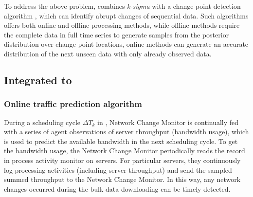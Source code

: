 {%
To address the above problem, \name combines \textit{k-sigma} with a change point detection algorithm \cite{adams2007bayesian}, which can identify abrupt changes of sequential data. Such algorithms offers both online and offline processing methods, while offline methods \cite{smith1975bayesian,stephens1994bayesian,barry1993bayesian,green1995reversible} require the complete data in full time series to generate samples from the posterior distribution over change point locations, online methods \cite{page1955test,desobry2005online,lorden1971procedures} can generate an accurate distribution of the next unseen data with only already observed data.

\subsection{Integrated to \bdsname}
\subsubsection{Online traffic prediction algorithm}


During a scheduling cycle $\Delta T_k$ in \name, Network Change Monitor is continually fed with a series of agent observations of server throughput (bandwidth usage), which is used to predict the available bandwidth in the next scheduling cycle. To get the bandwidth usage, the Network Change Monitor periodically reads the record in process activity monitor on servers. For particular servers, they continuously log processing activities (including server throughput) and send the sampled summed throughput to the Network Change Monitor. In this way, any network changes occurred during the bulk data downloading can be timely detected.

}
